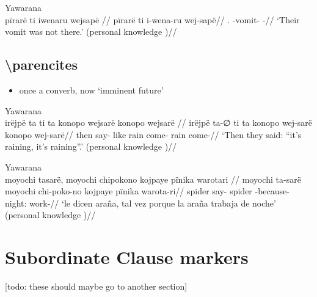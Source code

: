 \documentclass{memoir}
\begin{document}
\ex  Yawarana  \\\label{ctorat-19}
\begingl \glpreamble pïrarë ti iwenaru wejsapë //
\gla pïrarë ti i-wena-ru wej-sapë//
\glb {}.  -vomit- -//
\glft ‘Their vomit was not there.’ (personal knowledge
)//
\endgl
\xe

\subsection{\texorpdfstring{ \textbackslash parencites
\label{sec:sareimn}}{ \textbackslash parencites }}

\begin{itemize}
\tightlist
\item
  once a converb, now `imminent future'
\end{itemize}

\ex  Yawarana  \\\label{ctorat-25}
\begingl \glpreamble irëjpë ta ti ta konopo wejsarë konopo wejsarë //
\gla irëjpë ta-∅ ti ta konopo wej-sarë konopo wej-sarë//
\glb then say-  like rain come- rain come-//
\glft ‘Then they said: “it’s raining, it’s raining”.’ (personal knowledge
)//
\endgl
\xe

\ex  Yawarana  \\\label{ctoaragrme-25}
\begingl \glpreamble moyochi tasarë, moyochi chipokono kojpaye pïnika warotari //
\gla moyochi ta-sarë moyochi chi-poko-no kojpaye pïnika warota-ri//
\glb spider say- spider -because- night:  work-//
\glft ‘le dicen araña, tal vez porque la araña trabaja de noche’ (personal knowledge
)//
\endgl
\xe

\section{Subordinate Clause markers}

{[}todo: these should maybe go to another section{]}
\end{document}
